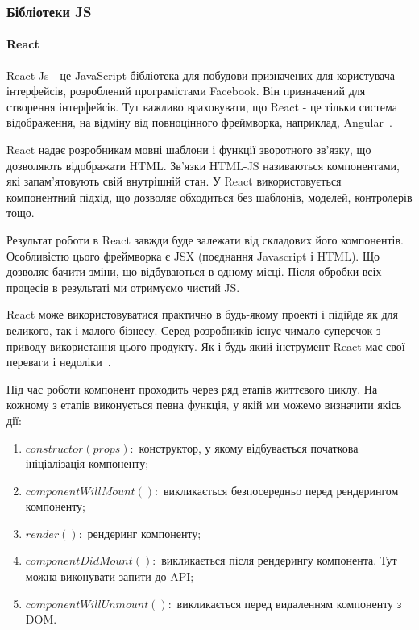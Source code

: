 \subsubsection{Бібліотеки JS}

\paragraph{React}

React Js - це JavaScript бібліотека для побудови призначених для користувача інтерфейсів, розроблений програмістами Facebook. Він призначений для створення інтерфейсів. Тут важливо враховувати, що React - це тільки система відображення, на відміну від повноцінного фреймворка, наприклад, Angular~\cite{fedosejev2015react}.

React надає розробникам мовні шаблони і функції зворотного зв'язку, що дозволяють відображати HTML. Зв'язки HTML-JS називаються компонентами, які запам'ятовують свій внутрішній стан. У React використовується компонентний підхід, що дозволяє обходиться без шаблонів, моделей, контролерів тощо.

Результат роботи в React завжди буде залежати від складових його компонентів. Особливістю цього фреймворка є JSX (поєднання Javascript і HTML). Що дозволяє бачити зміни, що відбуваються в одному місці. Після обробки всіх процесів в результаті ми отримуємо чистий JS.


React може використовуватися практично в будь-якому проекті і підійде як для великого, так і малого бізнесу. Серед розробників існує чимало суперечок з приводу використання цього продукту. Як і будь-який інструмент React має свої переваги і недоліки~\cite{caspers2017react}.

Під час роботи компонент проходить через ряд етапів життєвого циклу. На кожному з етапів виконується певна функція, у якій ми можемо визначити якісь дії:

\begin{enumerate}
    \item $constructor(props):$ конструктор, у якому відбувається початкова ініціалізація компоненту;
    \item $componentWillMount():$ викликається безпосередньо перед рендерингом компоненту;
    \item $render():$ рендеринг компоненту;
    \item $componentDidMount():$ викликається після рендерингу компонента. Тут можна виконувати запити до API;
    \item $componentWillUnmount():$ викликається перед видаленням компоненту з DOM.
\end{enumerate}

